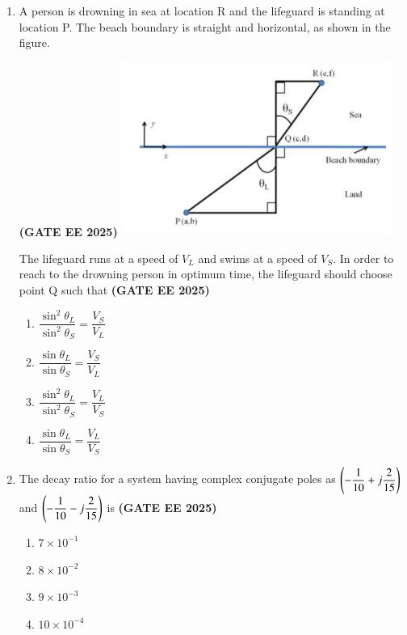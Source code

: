\documentclass[journal,12pt,onecolumn]{IEEEtran}
\theoremstyle{remark}
\begin{document}
\begin{enumerate}
\item A person is drowning in sea at location R and the lifeguard is standing at location P. The beach boundary is straight and horizontal, as shown in the figure.
\begin{center} \hfill \textbf{(GATE EE 2025)}
\includegraphics[width=0.7\textwidth]{figs/30.png}
\end{center}
The lifeguard runs at a speed of $V_{L}$ and swims at a speed of $V_{S}$. In order to reach to the drowning person in optimum time, the lifeguard should choose point Q such that
\hfill \textbf{(GATE EE 2025)} \begin{enumerate}
    \item $\dfrac{\sin^{2}\theta_{L}}{\sin^{2}\theta_{S}}=\dfrac{V_{S}}{V_{L}}$
    \item $\dfrac{\sin\theta_{L}}{\sin\theta_{S}}=\dfrac{V_{S}}{V_{L}}$
    \item $\dfrac{\sin^{2}\theta_{L}}{\sin^{2}\theta_{S}}=\dfrac{V_{L}}{V_{S}}$
    \item $\dfrac{\sin\theta_{L}}{\sin\theta_{S}}=\dfrac{V_{L}}{V_{S}}$
\end{enumerate}


\item The decay ratio for a system having complex conjugate poles as $\left(-\dfrac{1}{10}+j\dfrac{2}{15}\right)$ and $\left(-\dfrac{1}{10}-j\dfrac{2}{15}\right)$ is
\hfill \textbf{(GATE EE 2025)} \begin{enumerate}
    \item $7\times10^{-1}$
    \item $8\times10^{-2}$
    \item $9\times10^{-3}$
    \item $10\times10^{-4}$
\end{enumerate}



\end{enumerate}
\end{document}
